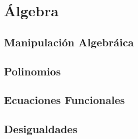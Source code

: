 
\chapter{Álgebra}

    \section{Manipulación Algebráica}

    \section{Polinomios}

    \section{Ecuaciones Funcionales}

    \section{Desigualdades}